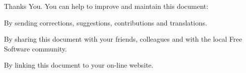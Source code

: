 
\startstandardmakeup
\dontleavehmode
\startcolor[darkblue]
\hfil\bfd Thanks You. \hfil
\blank[1cm]
\stopcolor
{\bfa You can help to improve and maintain this document:} \\
\startitemize
  \item By sending corrections, suggestions, contributions and translations.
  \item By sharing this document with your friends, colleagues and with the local Free Software community.
  \item By linking this document to your on-line website.
\stopitemize

\stopstandardmakeup
